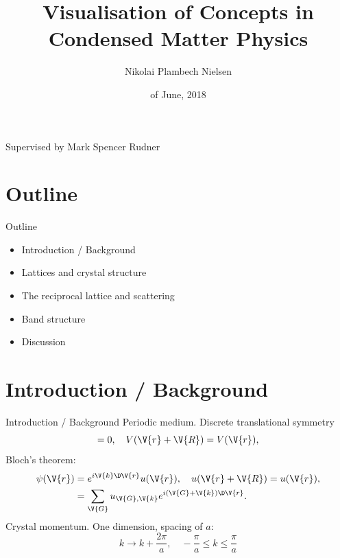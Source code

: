\documentclass{beamer}
\title[]{Visualisation of Concepts in Condensed Matter Physics}
\author{Nikolai Plambech Nielsen}
\institute[]{Niels Bohr Institute}
\date{\nth{27} of June, 2018}
\begin{document}
\begin{frame}
  \titlepage
  Supervised by Mark Spencer Rudner
\end{frame}


\section{Outline}
\begin{frame}{Outline}
\begin{itemize}
  \item Introduction / Background
  \item Lattices and crystal structure
  \item The reciprocal lattice and scattering
  \item Band structure
  \item Discussion
\end{itemize}
\end{frame}


\section{Introduction / Background}
\begin{frame}{Introduction / Background}
Periodic medium. Discrete translational symmetry
\begin{equation*}
	[\op{T}_{\V{R}}, \op{H}]=0, \quad  V(\V{r}+\V{R}) = V(\V{r}),
\end{equation*}
\pause
Bloch's theorem:
\begin{align*}
	\psi(\V{r}) &= e^{i \V{k}\D \V{r}} u(\V{r}), \quad u(\V{r}+\V{R}) = u(\V{r}), \\
	&= \sum_{\V{G}} u_{\V{G},\V{k}} e^{i (\V{G}+\V{k}) \D \V{r}}.
\end{align*}
\pause
Crystal momentum. One dimension, spacing of $ a $:
\begin{equation*}
	k \to k+\frac{2\pi}{a}, \quad -\frac{\pi}{a} \leq k \leq \frac{\pi}{a}
\end{equation*}
\end{frame}
\end{document}
